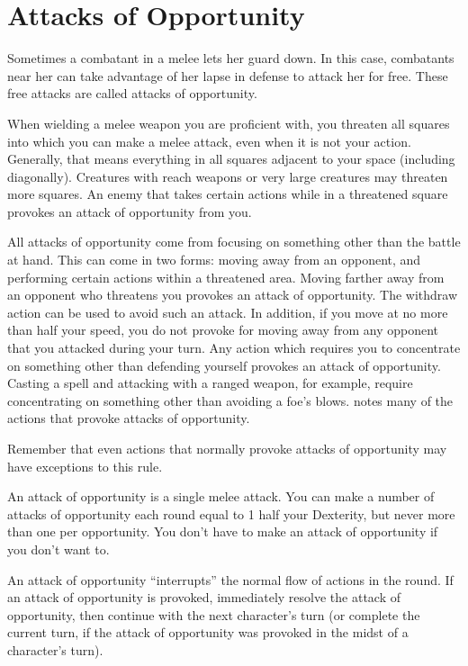 \section{Attacks of Opportunity}
Sometimes a combatant in a melee lets her guard down. In this case, combatants near her can take advantage of her lapse in defense to attack her for free. These free attacks are called attacks of opportunity.

 When wielding a melee weapon you are proficient with, you threaten all squares into which you can make a melee attack, even when it is not your action. Generally, that means everything in all squares adjacent to your space (including diagonally). Creatures with reach weapons or very large creatures may threaten more squares. An enemy that takes certain actions while in a threatened square provokes an attack of opportunity from you.

 All attacks of opportunity come from focusing on something other than the battle at hand. This can come in two forms: moving away from an opponent, and performing certain actions within a threatened area.
 Moving farther away from an opponent who threatens you provokes an attack of opportunity. The withdraw action can be used to avoid such an attack. In addition, if you move at no more than half your speed, you do not provoke for moving away from any opponent that you attacked during your turn.
 Any action which requires you to concentrate on something other than defending yourself provokes an attack of opportunity. Casting a spell and attacking with a ranged weapon, for example, require concentrating on something other than avoiding a foe's blows.  notes many of the actions that provoke attacks of opportunity.

\par Remember that even actions that normally provoke attacks of opportunity may have exceptions to this rule.

 An attack of opportunity is a single melee attack. You can make a number of attacks of opportunity each round equal to 1 \add half your Dexterity, but never more than one per opportunity. You don't have to make an attack of opportunity if you don't want to.

An attack of opportunity ``interrupts'' the normal flow of actions in the round. If an attack of opportunity is provoked, immediately resolve the attack of opportunity, then continue with the next character's turn (or complete the current turn, if the attack of opportunity was provoked in the midst of a character's turn).

